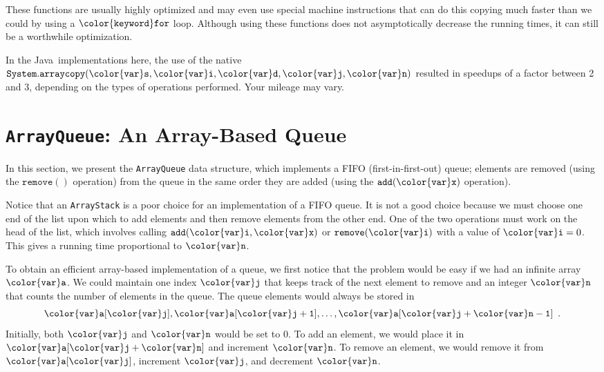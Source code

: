 \documentclass[10pt]{book}
\newcommand{\cpponly}[1]{}\newcommand{\javaonly}[1]{#1}\newcommand{\pcodeonly}[1]{}\newcommand{\notpcode}[1]{#1}\newcommand{\lang}{Java}
\newcommand{\seclabel}[1]{\label{sec:#1}}
\theoremstyle{plain}
\theoremstyle{definition}
\begin{document}
These functions are usually highly optimized and may even use special
machine instructions that can do this copying much faster than we could by
using a \ensuremath{\mathtt{{\color{keyword}for}}} loop.  Although using these functions does not asymptotically
decrease the running times, it can still be a worthwhile optimization.

\pcodeonly{In our C++ and Java implementations, the use of fast array
copying functions}
\notpcode{In the \lang\ implementations here, the use of the native\linebreak\javaonly{\ensuremath{\mathtt{System.arraycopy({\color{var}s},{\color{var}i},{\color{var}d},{\color{var}j},{\color{var}n})}}}\cpponly{\ensuremath{\mathtt{{\color{var}std}::copy({\color{var}a0},{\color{var}a1},{\color{var}b})}}}}
resulted in speedups of a factor between 2 and 3, depending on the types of
operations performed.  Your mileage may vary.

\section{\texttt{ArrayQueue}: An Array-Based Queue}
\seclabel{arrayqueue}

%
In this section, we present the \texttt{ArrayQueue} data structure, which
implements a FIFO (first-in-first-out) queue; elements are removed (using
the \ensuremath{\mathtt{remove()}} operation) from the queue in the same order they are added
(using the \ensuremath{\mathtt{add({\color{var}x})}} operation).

Notice that an \texttt{ArrayStack} is a poor choice for an implementation of a
FIFO queue.  It is not a good choice because we must choose one end of
the list upon which to add elements and then remove elements from the
other end.  One of the two operations must work on the head of the list,
which involves calling \ensuremath{\mathtt{add({\color{var}i},{\color{var}x})}} or \ensuremath{\mathtt{remove({\color{var}i})}} with a value of $\ensuremath{\mathtt{{\color{var}i}}}=0$.
This gives a running time proportional to \ensuremath{\mathtt{{\color{var}n}}}.

To obtain an efficient array-based implementation of a queue, we
first notice that the problem would be easy if we had an infinite
array \ensuremath{\mathtt{{\color{var}a}}}.  We could maintain one index \ensuremath{\mathtt{{\color{var}j}}} that keeps track of the
next element to remove and an integer \ensuremath{\mathtt{{\color{var}n}}} that counts the number of
elements in the queue.  The queue elements would always be stored in
\[ \ensuremath{\mathtt{{\color{var}a}[{\color{var}j}]}},\ensuremath{\mathtt{{\color{var}a}[{\color{var}j}+1]}},\ldots,\ensuremath{\mathtt{{\color{var}a}[{\color{var}j}+{\color{var}n}-1]}} \enspace . \]
Initially, both \ensuremath{\mathtt{{\color{var}j}}} and \ensuremath{\mathtt{{\color{var}n}}} would be 
set to 0.  To add an element, we would place it in \ensuremath{\mathtt{{\color{var}a}[{\color{var}j}+{\color{var}n}]}} and increment \ensuremath{\mathtt{{\color{var}n}}}.
To remove an element, we would remove it from \ensuremath{\mathtt{{\color{var}a}[{\color{var}j}]}}, increment \ensuremath{\mathtt{{\color{var}j}}}, and
decrement \ensuremath{\mathtt{{\color{var}n}}}.
\end{document}
